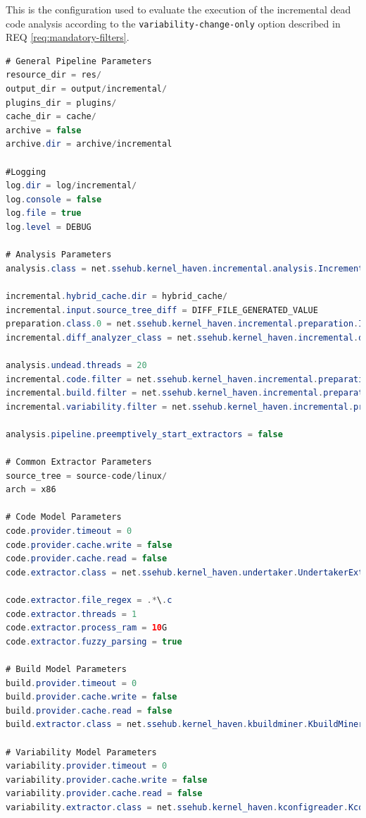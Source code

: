 \documentclass[a4paper]{article}
\begin{document}
This is the configuration used to evaluate the execution of the incremental dead code analysis according to the \texttt{variability-change-only} option described in  REQ \ref{req:mandatory-filters}.

\begin{lstlisting}[language=java]
# General Pipeline Parameters 
resource_dir = res/
output_dir = output/incremental/
plugins_dir = plugins/
cache_dir = cache/
archive = false
archive.dir = archive/incremental

#Logging
log.dir = log/incremental/
log.console = false
log.file = true
log.level = DEBUG

# Analysis Parameters
analysis.class = net.ssehub.kernel_haven.incremental.analysis.IncrementalThreadedDeadCodeAnalysis

incremental.hybrid_cache.dir = hybrid_cache/
incremental.input.source_tree_diff = DIFF_FILE_GENERATED_VALUE
preparation.class.0 = net.ssehub.kernel_haven.incremental.preparation.IncrementalPreparation
incremental.diff_analyzer_class = net.ssehub.kernel_haven.incremental.diff.analyzer.VariabilityDiffAnalyzer

analysis.undead.threads = 20
incremental.code.filter = net.ssehub.kernel_haven.incremental.preparation.filter.VariabilityChangeFilter
incremental.build.filter = net.ssehub.kernel_haven.incremental.preparation.filter.VariabilityChangeFilter
incremental.variability.filter = net.ssehub.kernel_haven.incremental.preparation.filter.VariabilityChangeFilter

analysis.pipeline.preemptively_start_extractors = false

# Common Extractor Parameters
source_tree = source-code/linux/
arch = x86

# Code Model Parameters
code.provider.timeout = 0
code.provider.cache.write = false
code.provider.cache.read = false
code.extractor.class = net.ssehub.kernel_haven.undertaker.UndertakerExtractor

code.extractor.file_regex = .*\.c
code.extractor.threads = 1
code.extractor.process_ram = 10G
code.extractor.fuzzy_parsing = true

# Build Model Parameters 
build.provider.timeout = 0
build.provider.cache.write = false
build.provider.cache.read = false
build.extractor.class = net.ssehub.kernel_haven.kbuildminer.KbuildMinerExtractor

# Variability Model Parameters
variability.provider.timeout = 0
variability.provider.cache.write = false
variability.provider.cache.read = false
variability.extractor.class = net.ssehub.kernel_haven.kconfigreader.KconfigReaderExtractor
\end{lstlisting}
\end{document}
